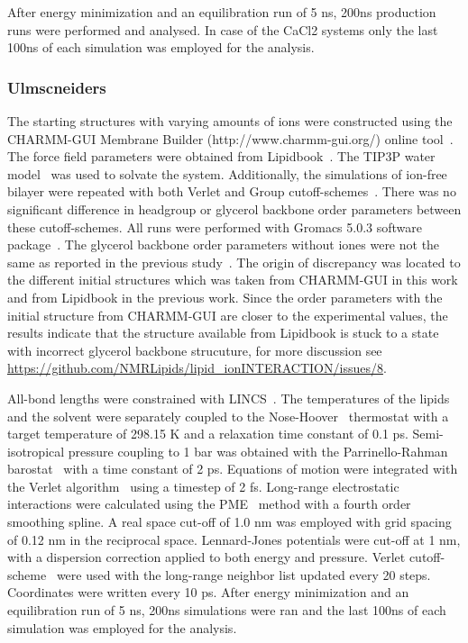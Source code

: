 \documentclass[pre,aps,floatfix,authordate1-4,twocolumn]{revtex4-1}
\begin{document}
After energy minimization and an equilibration run of 5 ns, 200ns production runs were performed and analysed. In case of the CaCl2 systems 
only the last 100ns of each simulation was employed for the analysis.

\subsubsection{Ulmscneiders}
The starting structures with varying amounts of ions were constructed using the CHARMM-GUI Membrane Builder (http://www.charmm-gui.org/) 
online tool~\cite{lee15}. The force field parameters were obtained from Lipidbook~\cite{domanski10}. The TIP3P water model~\cite{jorgensen83} 
was used to solvate the system.  Additionally, the simulations of ion-free bilayer were repeated with both Verlet and Group cutoff-schemes~\cite{ulmschneiderPOPC0mMNaClfiles}. 
There was no significant difference in headgroup or glycerol backbone order parameters between these cutoff-schemes. All runs were performed with Gromacs 5.0.3 software package~\cite{abraham15}. 
The glycerol backbone order parameters without iones were not the same as reported in the previous study~\cite{botan15}.
The origin of discrepancy was located to the different initial structures which was taken from CHARMM-GUI in this work
and from Lipidbook in the previous work. Since the order parameters with the initial structure from CHARMM-GUI are
closer to the experimental values, the results indicate that the structure available from Lipidbook is stuck to a
state with incorrect glycerol backbone strucuture, for more discussion see \url{https://github.com/NMRLipids/lipid_ionINTERACTION/issues/8}.

All-bond lengths were constrained with LINCS~\cite{hess97,hess07}. The temperatures of the lipids and the solvent were separately coupled to the Nose-Hoover~\cite{nose84,hoover85} 
thermostat with a target temperature of 298.15 K and a relaxation time constant of 0.1 ps. Semi-isotropical pressure coupling to 1 bar was obtained 
with the Parrinello-Rahman barostat~\cite{parrinello81} with a time constant of 2 ps. Equations of motion were integrated with the Verlet algorithm~\cite{pall13} using a 
timestep of 2 fs. Long-range electrostatic interactions were calculated using the PME~\cite{darden93,essman95} method with a fourth order smoothing spline. 
A real space cut-off of 1.0 nm was employed with grid spacing of 0.12 nm in the reciprocal space. Lennard-Jones potentials were cut-off at 1 nm, 
with a dispersion correction applied to both energy and pressure. Verlet cutoff-scheme~\cite{pall13} were used with the long-range neighbor list updated 
every 20 steps. Coordinates were written every 10 ps. After energy minimization and an equilibration run of 5 ns, 200ns simulations were ran and 
the last 100ns of each simulation was employed for the analysis.
\end{document}
